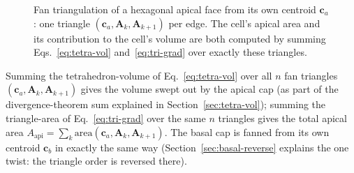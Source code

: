 \documentclass[11pt,a4paper]{report}
\newcommand{\Aarr}{\mathbf{A}}
\newcommand{\ca}{\mathbf{c}_a}
\newcommand{\cb}{\mathbf{c}_b}
\begin{document}
\begin{figure}[h]
\centering
{}
\caption{Fan triangulation of a hexagonal apical face from its own
centroid $\ca$: one triangle $(\ca,\Aarr_k,\Aarr_{k+1})$ per edge. The
cell's apical area and its contribution to the cell's volume are both
computed by summing Eqs.~\ref{eq:tetra-vol} and~\ref{eq:tri-grad} over
exactly these triangles.}
\label{fig:fan}
\end{figure}

Summing the tetrahedron-volume of Eq.~\ref{eq:tetra-vol} over all $n$
fan triangles $(\ca,\Aarr_k,\Aarr_{k+1})$ gives the volume swept out
by the apical cap (as part of the divergence-theorem sum explained in
Section~\ref{sec:tetra-vol}); summing the triangle-area of
Eq.~\ref{eq:tri-grad} over the same $n$ triangles gives the total
apical area $A_{\mathrm{api}} = \sum_k \mathrm{area}(\ca,\Aarr_k,\Aarr_{k+1})$.
The basal cap is fanned from its own centroid $\cb$ in exactly the
same way (Section~\ref{sec:basal-reverse} explains the one twist:
the triangle order is reversed there).
\end{document}

